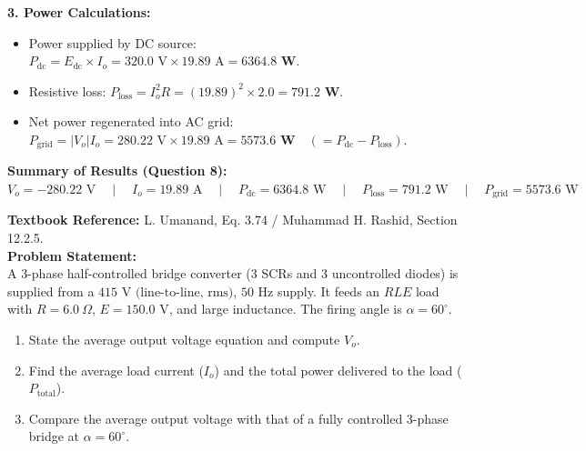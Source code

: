 \documentclass[10pt,a4paper]{article}
\begin{document}
\noindent\textbf{3. Power Calculations:}\\
\begin{itemize}
  \item Power supplied by DC source: $P_{\text{dc}} = E_{\text{dc}} \times I_o = 320.0\text{ V} \times 19.89\text{ A} = \mathbf{6364.8\text{ W}}$.
  \item Resistive loss: $P_{\text{loss}} = I_o^2 R = (19.89)^2 \times 2.0 = \mathbf{791.2\text{ W}}$.
  \item Net power regenerated into AC grid: $P_{\text{grid}} = |V_o| I_o = 280.22\text{ V} \times 19.89\text{ A} = \mathbf{5573.6\text{ W}} \quad (= P_{\text{dc}} - P_{\text{loss}})$.
\end{itemize}

\begin{tcolorbox}[resbox]
\textbf{\textcolor{accentcyan}{Summary of Results (Question 8):}}\\
$V_o = -280.22\text{ V} \quad\mid\quad I_o = 19.89\text{ A} \quad\mid\quad P_{\text{dc}} = 6364.8\text{ W} \quad\mid\quad P_{\text{loss}} = 791.2\text{ W} \quad\mid\quad P_{\text{grid}} = 5573.6\text{ W}$
\end{tcolorbox}

\vspace{4mm}

\begin{tcolorbox}[qbox, title={Question 9: Three-Phase Half-Controlled Bridge Converter (Semi-converter)}]
\textbf{Textbook Reference:} L. Umanand, Eq. 3.74 / Muhammad H. Rashid, Section 12.2.5.\\[1mm]
\textbf{Problem Statement:}\\
A 3-phase half-controlled bridge converter (3 SCRs and 3 uncontrolled diodes) is supplied from a $415\text{ V (line-to-line, rms)}$, $50\text{ Hz}$ supply. It feeds an $RLE$ load with $R = 6.0\ \Omega$, $E = 150.0\text{ V}$, and large inductance. The firing angle is $\alpha = 60^\circ$.
\begin{enumerate}
  \item State the average output voltage equation and compute $V_o$.
  \item Find the average load current ($I_o$) and the total power delivered to the load ($P_{\text{total}}$).
  \item Compare the average output voltage with that of a fully controlled 3-phase bridge at $\alpha = 60^\circ$.
\end{enumerate}
\end{tcolorbox}
\end{document}
